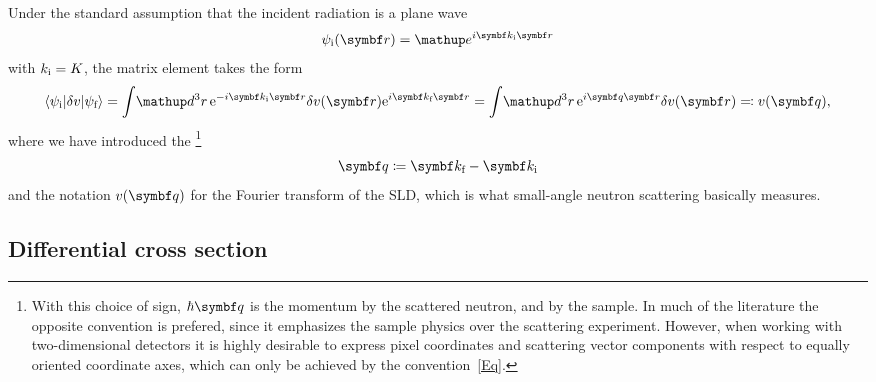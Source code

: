 Under the standard assumption
that the incident radiation is a plane wave
%
\begin{equation}\label{EPsi0Plane}
  \psi_\ti(\r)=\e^{i \k_\ti \r}
\end{equation}
with $k_{\text{i}}=K$,
the matrix element takes the form
\begin{equation}\label{Echiq}
  \bra \psi_\ti|\delta v|\psi_\tf\ket
  = \int\!\d^3r\, {\rm e}^{-i\k_\ti\r}\delta v(\r){\rm e}^{i\k_\tf\r}
  = \int\!\d^3r\, {\rm e}^{i\q\r}\delta v(\r)
  \eqqcolon v(\q),
\end{equation}
%
where we have introduced the \footnote
{With this choice of sign,
%
$\hbar\q$ is the momentum
%
 by the scattered neutron,
and  by the sample.
In much of the literature the opposite convention is prefered,
since it emphasizes the sample physics over the scattering experiment.
However, when working with two-dimensional detectors
it is highly desirable to express pixel coordinates
and scattering vector components
with respect to equally oriented coordinate axes,
which can only be achieved by the convention~\cref{Eq}.}
%
\begin{equation}\label{Eq}
  \q\coloneqq \k_\tf-\k_\ti
\end{equation}
%
and the notation $v(\q)$ for
the Fourier transform of the SLD,
%
which is what small-angle neutron scattering basically measures.

%


\subsection{Differential cross section}\label{SdiffCross}

